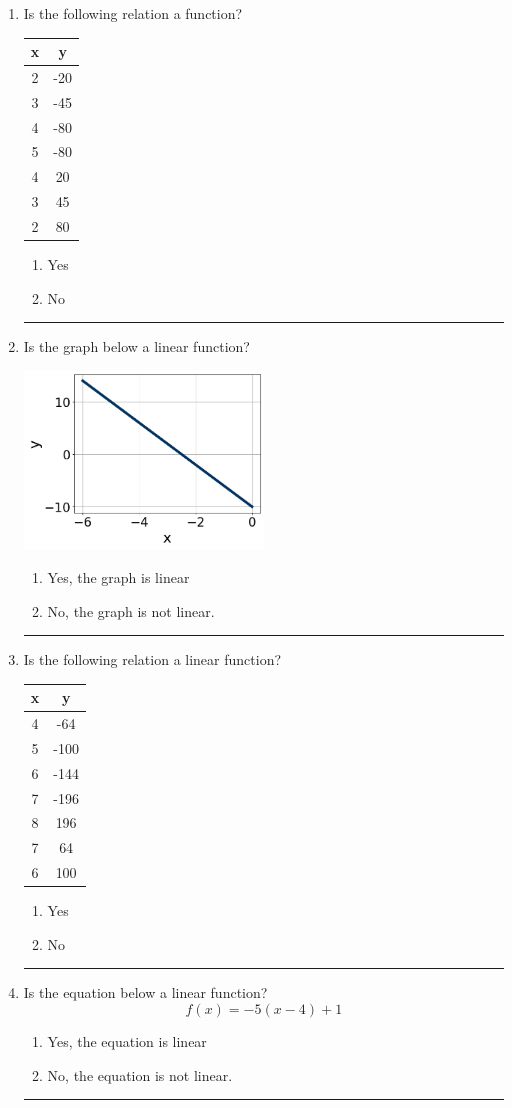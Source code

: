 \documentclass[14pt]{extbook}
\newcommand{\litem}[1]{\item#1\hspace*{-1cm}\rule{\textwidth}{0.4pt}}
\begin{document}
\begin{enumerate}
\litem{
Is the following relation a function?

\begin{tabular}{c|c}
x &y\tabularnewline \hline
2 &-20\tabularnewline \hline
3 &-45\tabularnewline \hline
4 &-80\tabularnewline \hline
5 &-80\tabularnewline \hline
4 &20\tabularnewline \hline
3 &45\tabularnewline \hline
2 &80\end{tabular}\begin{enumerate}[label=\Alph*.]
\item Yes
\item No

\end{enumerate} }
\litem{
Is the graph below a linear function?
\begin{center}
    \includegraphics[width=0.5\textwidth]{../Figures/MA_8_F_1_2_graphA.png}
\end{center}
\begin{enumerate}[label=\Alph*.]
\item Yes, the graph is linear
\item No, the graph is not linear.

\end{enumerate} }
\litem{
Is the following relation a linear function?

\begin{tabular}{c|c}
x &y\tabularnewline \hline
4 &-64\tabularnewline \hline
5 &-100\tabularnewline \hline
6 &-144\tabularnewline \hline
7 &-196\tabularnewline \hline
8 &196\tabularnewline \hline
7 &64\tabularnewline \hline
6 &100\end{tabular}\begin{enumerate}[label=\Alph*.]
\item Yes
\item No

\end{enumerate} }
\litem{
Is the equation below a linear function?\[ f(x) = -5(x -4)+1 \]\begin{enumerate}[label=\Alph*.]
\item Yes, the equation is linear
\item No, the equation is not linear.

\end{enumerate} }
\end{enumerate}
\end{document}
